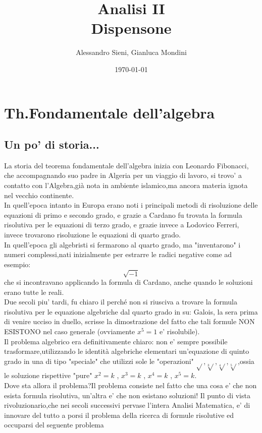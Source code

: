 \documentclass[fontsize = 20px, paper = a4]{article}
\author{Alessandro Sieni, Gianluca Mondini}
\title{Analisi II \\ Dispensone}
\date{\today}
\begin{document}
\maketitle
\newpage
\tableofcontents
\newpage


\section{Th.Fondamentale dell'algebra}
\subsection{Un po' di storia...}
La storia del teorema fondamentale dell'algebra inizia con Leonardo Fibonacci, che accompagnando suo padre in Algeria per un viaggio di lavoro, si trovo' a contatto con l'Algebra,già nota in ambiente islamico,ma ancora materia ignota nel vecchio continente.\\
In quell'epoca intanto in Europa erano noti i principali metodi di risoluzione delle equazioni di primo e secondo grado, e grazie a Cardano fu trovata la formula risolutiva per le equazioni di terzo grado, e grazie invece a Lodovico Ferreri, invece trovarono risoluzione le equazioni di quarto grado.\\
In quell'epoca gli algebristi si fermarono al quarto grado, ma "inventarono" i numeri complessi,nati inizialmente per estrarre le radici negative come ad esempio: $$\sqrt{-1}$$
che si incontravano applicando la formula di Cardano, anche quando le soluzioni erano tutte le reali.\\
Due secoli piu' tardi, fu chiaro il perché non si riusciva a trovare la formula risolutiva per le equazione algebriche dal quarto grado in su: Galois, la sera prima di venire ucciso in duello, scrisse la dimostrazione del fatto che tali formule NON ESISTONO nel caso generale (ovviamente $x^5 = 1$ e' risolubile).\\
Il problema algebrico era definitivamente chiaro: non e' sempre possibile trasformare,utilizzando le identità algebriche elementari un'equazione di quinto grado in una di tipo "speciale" che utilizzi sole le "operazioni"
$\sqrt{}$,$\sqrt[3]{}$,$\sqrt[4]{}$,$\sqrt[5]{}$,ossia le soluzione rispettive "pure" $x^2 = k$ , $x^3 = k$ , $x^4 = k$ , $x^5 = k$.\\
Dove sta allora il problema?Il problema consiste nel fatto che una cosa e' che non esista formula risolutiva, un'altra e' che non esistano soluzioni! Il punto di vista rivoluzionario,che nei secoli successivi pervase l'intera  
Analisi Matematica, e' di innovare del tutto a porsi il problema della ricerca di formule risolutive ed occuparsi del seguente problema\\ \\
\end{document}

